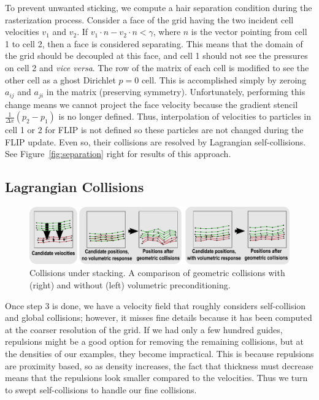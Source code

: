 To prevent unwanted sticking, we compute a hair separation condition during the
rasterization process. Consider a face of the grid having the two incident cell
velocities $v_1$ and $v_2$.  If $v_1\cdot n - v_2\cdot n<\gamma$,
where $n$ is the vector pointing from cell 1 to cell 2, then a face is
considered separating. This means that the domain of the grid should be
decoupled at this face, and cell 1 should not see the pressures on cell 2 and
\emph{vice versa}.  The row of the matrix of each cell is modified to see the
other cell as a ghost Dirichlet $p=0$ cell. This is accomplished simply by
zeroing $a_{ij}$ and $a_{ji}$ in the matrix (preserving
symmetry). Unfortunately, performing this change means we cannot project the
face velocity because the gradient stencil $\frac{1}{\Delta x}(p_2-p_1)$ is no
longer defined. Thus, interpolation of velocities to particles in cell 1 or 2
for FLIP is not defined so these particles are not changed during the FLIP update.  Even so,
their collisions are resolved by Lagrangian self-collisions. See
Figure~\ref{fig:separation} right for results of this approach.

\vspace{-5pt}
\subsection{Lagrangian Collisions}
\label{sec:collisions}
\vspace{-5pt}

\begin{figure}[b!]
\vspace{-9pt}
  \centering
  \includegraphics[width=.99\linewidth]{hair/figures/stacking}
  \caption{\label{fig:stacking} Collisions under stacking. A
    comparison of geometric collisions with (right) and without (left)
    volumetric preconditioning.}

\end{figure}


Once step 3 is done, we have a velocity field that roughly considers
self-collision and global collisions; however, it misses fine details because it
has been computed at the coarser resolution of the grid. If we had only a few
hundred guides, repulsions might be a good option for removing the remaining
collisions, but at the densities of our examples, they become impractical.  This
is because repulsions are proximity based, so as density increases, the fact that
thickness must decrease means that the repulsions look smaller compared to the
velocities. Thus we turn to swept self-collisions to handle our fine collisions.

